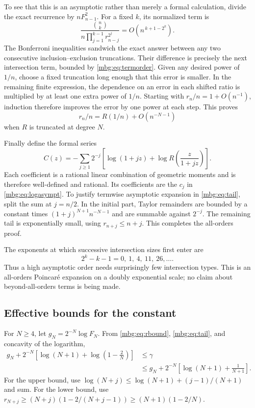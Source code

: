 \documentclass[11pt,letterpaper]{article}
\theoremstyle{definition}
\begin{document}
To see that this is an asymptotic rather than merely a formal calculation, divide the exact recurrence by $nF_{n-1}^2$. For a fixed $k$, its normalized term is
\begin{equation}
 \frac{\binom nk}{n\prod_{j=1}^{k-1}r_{n-j}^{2^j}}
                  =O\left(n^{\,k+1-2^k}\right).
 \label{mbg:eq:termorder}
\end{equation}
The Bonferroni inequalities sandwich the exact answer between any two consecutive inclusion--exclusion truncations. Their difference is precisely the next intersection term, bounded by \eqref{mbg:eq:termorder}. Given any desired power of $1/n$, choose a fixed truncation long enough that this error is smaller. In the remaining finite expression, the dependence on an error in each shifted ratio is multiplied by at least one extra power of $1/n$. Starting with $r_n/n=1+O(n^{-1})$, induction therefore improves the error by one power at each step. This proves
\[
 r_n/n=R(1/n)+O(n^{-N-1})
\]
when $R$ is truncated at degree $N$.

Finally define the formal series
\begin{equation}
 C(z)=-\sum_{j\ge1}2^{-j}
      \left[\log(1+jz)+\log R\left(\frac z{1+jz}\right)\right].
 \label{mbg:eq:Cformal}
\end{equation}
Each coefficient is a rational linear combination of geometric moments and is therefore well-defined and rational. Its coefficients are the $c_j$ in \eqref{mbg:eq:logasympt}. To justify termwise asymptotic expansion in \eqref{mbg:eq:tail}, split the sum at $j=n/2$. In the initial part, Taylor remainders are bounded by a constant times $(1+j)^{N+1}n^{-N-1}$ and are summable against $2^{-j}$. The remaining tail is exponentially small, using $r_{n+j}\le n+j$. This completes the all-orders proof.

The exponents at which successive intersection sizes first enter are
\[
 2^k-k-1=0,\ 1,\ 4,\ 11,\ 26,\ldots.
\]
Thus a high asymptotic order needs surprisingly few intersection types. This is an all-orders Poincar\'e expansion on a doubly exponential scale; no claim about beyond-all-orders terms is being made.

\subsection{Effective bounds for the constant}
For $N\ge4$, let $g_N=2^{-N}\log F_N$. From \eqref{mbg:eq:rbound}, \eqref{mbg:eq:tail}, and concavity of the logarithm,
\begin{equation}
\begin{split}
 g_N+2^{-N}\left[\log(N+1)+\log\left(1-\frac2N\right)\right]
 &\le\gamma\\
 &\le g_N+2^{-N}\left[\log(N+1)+\frac1{N+1}\right].
\end{split}
\label{mbg:eq:gammabounds}
\end{equation}
For the upper bound, use
$\log(N+j)\le\log(N+1)+(j-1)/(N+1)$ and sum. For the lower bound, use
$r_{N+j}\ge(N+j)(1-2/(N+j-1))\ge(N+1)(1-2/N)$.
\end{document}
